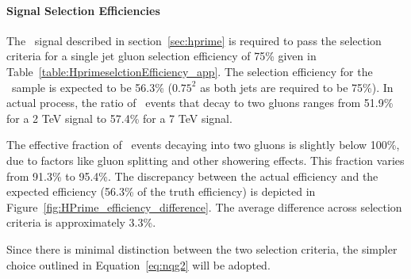 \FloatBarrier


\paragraph{Signal Selection Efficiencies\\}

The \Hprime\ signal described in section~\ref{sec:hprime} is required to pass the selection criteria for a single jet gluon selection efficiency of 75\% given in Table~\ref{table:HprimeselctionEfficiency_app}. The selection efficiency for the \Hprime\ sample is expected to be 56.3\% ($0.75^2$ as both jets are required to be 75\%). In actual process, the ratio of \Hprime\ events that decay to two gluons ranges from 51.9\% for a 2 TeV signal to 57.4\% for a 7 TeV signal.

The effective fraction of \Hprime\ events decaying into two gluons is slightly below 100\%, due to factors like gluon splitting and other showering effects. This fraction varies from 91.3\% to 95.4\%. The discrepancy between the actual efficiency and the expected efficiency (56.3\% of the truth efficiency) is depicted in Figure~\ref{fig:HPrime_efficiency_difference}. The average difference across selection criteria is approximately 3.3\%.

Since there is minimal distinction between the two selection criteria, the simpler choice outlined in Equation~\ref{eq:nqg2} will be adopted.

